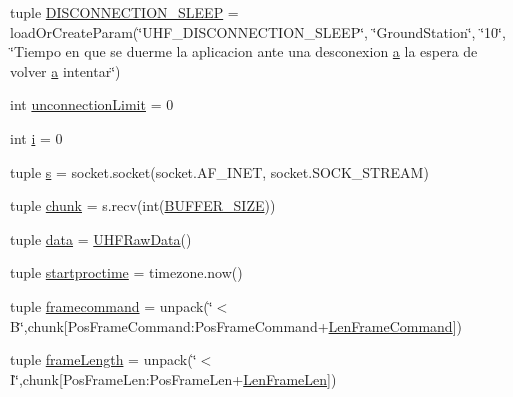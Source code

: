 \begin{DoxyCompactItemize}
\item 
tuple \hyperlink{namespace_tlmy_cmd_processor_1_1_tlmy_cmd_processor_a053a883aeff5a224089cd5c791e2bc4c}{D\+I\+S\+C\+O\+N\+N\+E\+C\+T\+I\+O\+N\+\_\+\+S\+L\+E\+E\+P} = load\+Or\+Create\+Param(\char`\"{}U\+H\+F\+\_\+\+D\+I\+S\+C\+O\+N\+N\+E\+C\+T\+I\+O\+N\+\_\+\+S\+L\+E\+E\+P\char`\"{}, \char`\"{}Ground\+Station\char`\"{}, \char`\"{}10\char`\"{}, \char`\"{}Tiempo en que se duerme la aplicacion ante una desconexion \hyperlink{bootstrap_8min_8js_a9252b696bd8018d152e6640fcbe6e3b8}{a} la espera de volver \hyperlink{bootstrap_8min_8js_a9252b696bd8018d152e6640fcbe6e3b8}{a} intentar\char`\"{})
\item 
int \hyperlink{namespace_tlmy_cmd_processor_1_1_tlmy_cmd_processor_a6cdf230e4055a51015bd349429c112f7}{unconnection\+Limit} = 0
\item 
int \hyperlink{namespace_tlmy_cmd_processor_1_1_tlmy_cmd_processor_a1eff3ca925b902581b463553a187bba9}{i} = 0
\item 
tuple \hyperlink{namespace_tlmy_cmd_processor_1_1_tlmy_cmd_processor_a5b740cec8cab496e71b6896c16dfba9d}{s} = socket.\+socket(socket.\+A\+F\+\_\+\+I\+N\+E\+T, socket.\+S\+O\+C\+K\+\_\+\+S\+T\+R\+E\+A\+M)
\item 
tuple \hyperlink{namespace_tlmy_cmd_processor_1_1_tlmy_cmd_processor_a1ed237493e0f74a1a922ee4b54ef0657}{chunk} = s.\+recv(int(\hyperlink{namespace_tlmy_cmd_processor_1_1_tlmy_cmd_processor_ad6b870e079ada467cc4ac0b8f1f73039}{B\+U\+F\+F\+E\+R\+\_\+\+S\+I\+Z\+E}))
\item 
tuple \hyperlink{namespace_tlmy_cmd_processor_1_1_tlmy_cmd_processor_aa2dfd09891072d77d04b841a8bed1462}{data} = \hyperlink{class_ground_segment_1_1models_1_1_u_h_f_raw_data_1_1_u_h_f_raw_data}{U\+H\+F\+Raw\+Data}()
\item 
tuple \hyperlink{namespace_tlmy_cmd_processor_1_1_tlmy_cmd_processor_a58134e0397913f644139bdd4478e338f}{startproctime} = timezone.\+now()
\item 
tuple \hyperlink{namespace_tlmy_cmd_processor_1_1_tlmy_cmd_processor_acf404d27b5f133da140197499acc28e0}{framecommand} = unpack(\char`\"{}$<$B\char`\"{},chunk\mbox{[}Pos\+Frame\+Command\+:\+Pos\+Frame\+Command+\hyperlink{namespace_tlmy_cmd_processor_1_1_tlmy_cmd_processor_a64ebb9875c3f0f30fd7cd3b962d812f3}{Len\+Frame\+Command}\mbox{]})
\item 
tuple \hyperlink{namespace_tlmy_cmd_processor_1_1_tlmy_cmd_processor_a6fd23321acd4d3b684cf5982e2ef65e1}{frame\+Length} = unpack(\char`\"{}$<$I\char`\"{},chunk\mbox{[}Pos\+Frame\+Len\+:\+Pos\+Frame\+Len+\hyperlink{namespace_tlmy_cmd_processor_1_1_tlmy_cmd_processor_a4258f8620fd2045719a2170f64913b1f}{Len\+Frame\+Len}\mbox{]})

\end{DoxyCompactItemize}

